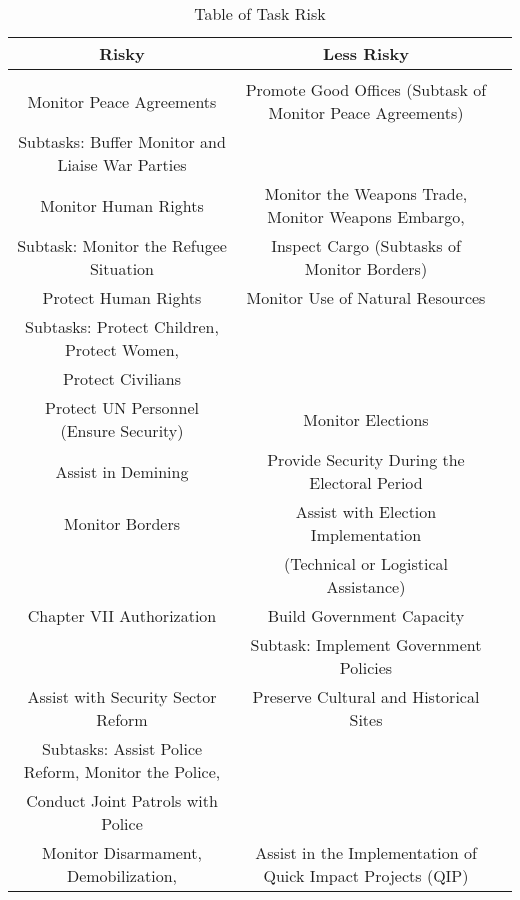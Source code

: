 \begin{table}[t]\centering
\fontsize{7.5}{7.5}\selectfont
\def\sym#1{\ifmmode^{#1}\else\(^{#1}\)\fi}
\caption{Table of Task Risk}
\label{Table 1}
\begin{tabular}{c*{2}{c}}
\hline\hline
                    \multicolumn{1}{c}{Risky}         &\multicolumn{1}{c}{Less Risky}      \\
\hline \\
Monitor Peace Agreements                                & Promote Good Offices (Subtask of Monitor Peace Agreements) \\
Subtasks: Buffer Monitor and Liaise War Parties         &  \\
[0.5em]
Monitor Human Rights                                    &   Monitor the Weapons Trade, Monitor Weapons Embargo, \\ 
Subtask: Monitor the Refugee Situation                  & Inspect Cargo (Subtasks of Monitor Borders) \\ 
[0.5em]
Protect Human Rights                                    & Monitor Use of Natural Resources \\
Subtasks: Protect Children, Protect Women,              &  \\
Protect Civilians                                       & \\
[0.5em]
Protect UN Personnel (Ensure Security)                  & Monitor Elections \\
[0.5em]
Assist in Demining                                     & Provide Security During the Electoral Period\\     
[0.5em]
Monitor Borders                                         & Assist with Election Implementation \\
                                                        & (Technical or Logistical Assistance) \\
[0.5em]
Chapter VII Authorization                               & Build Government Capacity \\
                                                        & Subtask: Implement Government Policies \\
[0.5em]
Assist with Security Sector Reform                      & Preserve Cultural and Historical Sites \\ 
Subtasks: Assist Police Reform, Monitor the Police,     &   \\
Conduct Joint Patrols with Police                        &   \\ 
[0.5em]
Monitor Disarmament, Demobilization,                    & Assist in the Implementation of Quick Impact Projects (QIP) \\

\end{tabular}
\end{table}
